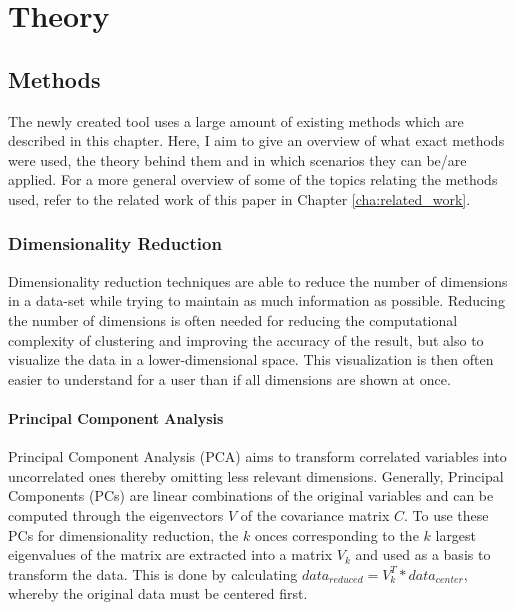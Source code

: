 \documentclass[
	a4paper,
	english,
	twoside,
	openright,               
	11pt                            
	]{report}
\begin{document}
\part{Theory}
\chapter{Methods}\label{cha:methods}
The newly created tool uses a large amount of existing methods which are described in this chapter. Here, I aim to give an overview of what exact methods were used, the theory behind them and in which scenarios they can be/are applied. For a more general overview of some of the topics relating the methods used, refer to the related work of this paper in Chapter \ref{cha:related_work}.

\section{Dimensionality Reduction}\label{sec:dim_reduction}
Dimensionality reduction techniques are able to reduce the number of dimensions in a data-set while trying to maintain as much information as possible. Reducing the number of dimensions is often needed for reducing the computational complexity of clustering and improving the accuracy of the result, but also to visualize the data in a lower-dimensional space. This visualization is then often easier to understand for a user than if all dimensions are shown at once.
\subsection{Principal Component Analysis}
 Principal Component Analysis (PCA) \cite{pca} aims to transform correlated variables into uncorrelated ones thereby omitting less relevant dimensions. Generally, Principal Components (PCs) are linear combinations of the original variables and can be computed through the eigenvectors $V$ of the covariance matrix $C$. To use these PCs for dimensionality reduction, the $k$ onces corresponding to the $k$ largest eigenvalues of the matrix are extracted into a matrix $V_k$ and used as a basis to transform the data. This is done by calculating $data_{reduced}=V_k^T*data_{center}$, whereby the original data must be centered first.
\end{document}
